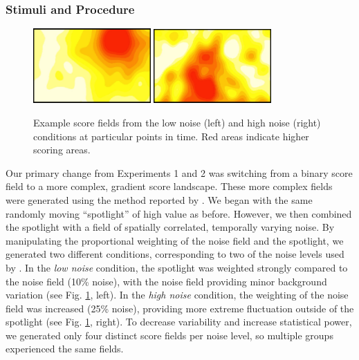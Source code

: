 \documentclass[12pt,letterpaper]{article}
\begin{document}
\subsubsection{Stimuli and Procedure}

\begin{figure}
  \centering
  \includegraphics[width=0.4\textwidth]{./figures/easy-field}
  \hspace{0.1cm}
  \includegraphics[width=0.4\textwidth]{./figures/medium-field}
  \caption{Example score fields from the low noise (left) and high noise (right) conditions at particular points in time.  Red areas indicate higher scoring areas.}
  \label{fig:score_exp3}
\end{figure}


Our primary change from Experiments 1 and 2 was switching from a binary score field to a more complex, gradient score landscape.
These more complex fields were generated using the method reported by . 
We began with the same randomly moving ``spotlight'' of high value as before. 
However, we then combined the spotlight with a field of spatially correlated, temporally varying noise.  
By manipulating the proportional weighting of the noise field and the spotlight, we generated two different conditions, corresponding to two of the noise levels used by \citeauthor{berdahl_emergent_2013}. 
In the \emph{low noise} condition, the spotlight was weighted strongly compared to the noise field (10\% noise), with the noise field providing minor background variation (see Fig. \ref{fig:score_exp3}, left). 
In the \emph{high noise} condition, the weighting of the noise field was increased (25\% noise), providing more extreme fluctuation outside of the spotlight (see Fig. \ref{fig:score_exp3}, right).
To decrease variability and increase statistical power, we generated only four distinct score fields per noise level, so multiple groups experienced the same fields.  
\end{document}
